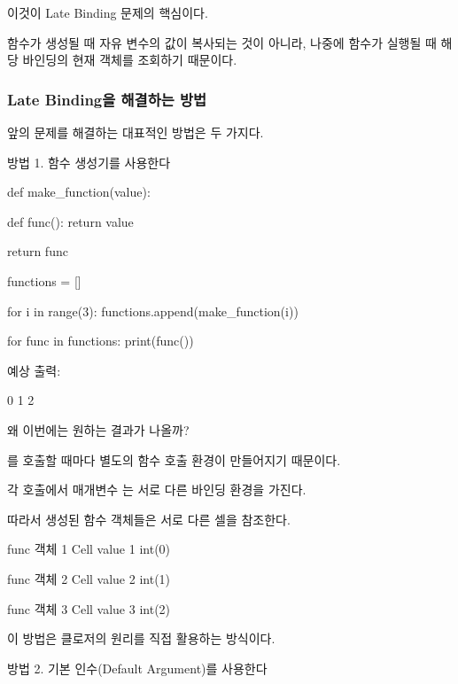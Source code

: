 이것이 Late Binding 문제의 핵심이다.

함수가 생성될 때 자유 변수의 값이 복사되는 것이 아니라, 나중에 함수가 실행될 때 해당 바인딩의 현재 객체를 조회하기 때문이다.

\subsubsection{Late Binding을 해결하는 방법}

앞의 문제를 해결하는 대표적인 방법은 두 가지다.

\begin{dhknote}
\begin{dhksmry}[centered]
방법 1. 함수 생성기를 사용한다
\end{dhksmry}
\end{dhknote}

\begin{dhkcode}
def make_function(value):

    def func():
        return value

    return func


functions = []

for i in range(3):
    functions.append(make_function(i))


for func in functions:
    print(func())
\end{dhkcode}

예상 출력:

\begin{dhkzsh}
0
1
2
\end{dhkzsh}

왜 이번에는 원하는 결과가 나올까?

를 호출할 때마다 별도의 함수 호출 환경이 만들어지기 때문이다.

각 호출에서 매개변수 는 서로 다른 바인딩 환경을 가진다.

따라서 생성된  함수 객체들은 서로 다른 셀을 참조한다.

\begin{dhksmry}
    func 객체 1 \ra Cell value 1 \ra int(0)

    func 객체 2 \ra Cell value 2 \ra int(1)

    func 객체 3 \ra Cell value 3 \ra int(2)
\end{dhksmry}

이 방법은 클로저의 원리를 직접 활용하는 방식이다.

\begin{dhknote}
\begin{dhksmry}[centered]
방법 2. 기본 인수(Default Argument)를 사용한다
\end{dhksmry}
\end{dhknote}

